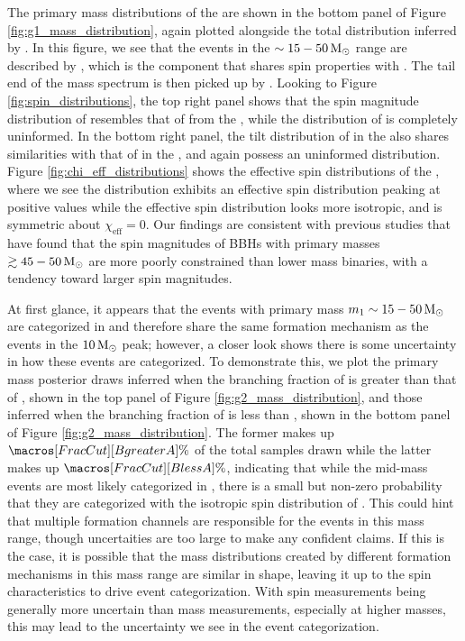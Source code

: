 The primary mass distributions of the \comp{} are shown in the bottom panel of Figure \ref{fig:g1_mass_distribution}, again plotted alongside the total distribution inferred by \brucepaper{}. In this figure, we see that the events in the $\sim15-50 {\,\rm M}_\odot$ range are described by \contA{}, which is the component that shares spin properties with \first{}. The tail end of the mass spectrum is then picked up by \popB{}. Looking to Figure \ref{fig:spin_distributions}, the top right panel shows that the spin magnitude distribution of \popA{} resembles that of \popA{} from the \base{}, while the distribution of \popB{} is completely uninformed. In the bottom right panel, the tilt distribution of \popA{} in the \comp{} also shares similarities with that of \popA{} in the \base{}, and again \popB{} possess an uninformed distribution. Figure \ref{fig:chi_eff_distributions} shows the effective spin distributions of the \comp{}, where we see the \popA{} distribution exhibits an effective spin distribution peaking at positive values while the \popB{} effective spin distribution looks more isotropic, and is symmetric about $\chi_\mathrm{eff} = 0$. Our findings are consistent with previous studies \citep{2023PhRvX..13a1048A,2110.13542} that have found that the spin magnitudes of BBHs with primary masses $\gtrsim 45-50 {\,\rm M}_\odot$ are more poorly constrained than lower mass binaries, with a tendency toward larger spin magnitudes.


At first glance, it appears that the events with primary mass $m_1 \sim 15-50 {\,\rm M}_\odot$ are categorized in \popA{} and therefore share the same formation mechanism as the events in the $10{\,\rm M}_\odot$ peak; however, a closer look shows there is some uncertainty in how these events are categorized. To demonstrate this, we plot the primary mass posterior draws inferred when the branching fraction of \contA{} is greater than that of \contB{}, shown in the top panel of Figure \ref{fig:g2_mass_distribution}, and those inferred when the branching fraction of \contA{} is less than \contB{}, shown in the bottom panel of Figure \ref{fig:g2_mass_distribution}. The former makes up $\macros[FracCut][BgreaterA]\%$ of the total samples drawn while the latter makes up $\macros[FracCut][BlessA]\%$, indicating that while the mid-mass events are most likely categorized in \popA{}, there is a small but non-zero probability that they are categorized with the isotropic spin distribution of \popB{}. This could hint that multiple formation channels are responsible for the events in this mass range, though uncertaities are too large to make any confident claims. If this is the case, it is possible that the mass distributions created by different formation mechanisms in this mass range are similar in shape, leaving it up to the spin characteristics to drive event categorization. With spin measurements being generally more uncertain than mass measurements, especially at higher masses, this may lead to the uncertainty we see in the event categorization. 

